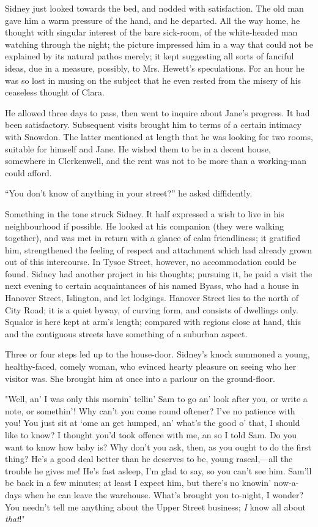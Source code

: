 Sidney just looked towards the bed, and nodded with satisfaction. The
old man gave him a warm pressure of the hand, and he departed. All the
way home, he thought with singular interest of the bare sick-room, of
the white-headed man watching through the night; the picture impressed
him in a way that could not be explained by its natural pathos merely;
it kept suggesting all sorts of fanciful ideas, due in a measure,
possibly, to Mrs. Hewett's speculations. For an hour he was so lost in
musing on the subject that he even rested from the misery of his
ceaseless thought of Clara.

He allowed three days to pass, then went to inquire about Jane's
progress. It had been {\protect\hypertarget{155}{}{}}satisfactory.
Subsequent visits brought him to terms of a certain intimacy with
Snowdon. The latter mentioned at length that he was looking for two
rooms, suitable for himself and Jane. He wished them to be in a decent
house, somewhere in Clerkenwell, and the rent was not to be more than a
working-man could afford.

``You don't know of anything in your street?'' he asked diffidently.

Something in the tone struck Sidney. It half expressed a wish to live in
his neighbourhood if possible. He looked at his companion (they were
walking together), and was met in return with a glance of calm
friendliness; it gratified him, strengthened the feeling of respect and
attachment which had already grown out of this intercourse. In Tysoe
Street, however, no accommodation could be found. Sidney had another
project in his thoughts; pursuing it, he paid a visit the next evening
to certain acquaintances of his named Byass, who had a house in Hanover
Street, Islington, and let lodgings. Hanover Street
{\protect\hypertarget{156}{}{}}lies to the north of City Road; it is a
quiet byway, of curving form, and consists of dwellings only. Squalor is
here kept at arm's length; compared with regions close at hand, this and
the contiguous streets have something of a suburban aspect.

Three or four steps led up to the house-door. Sidney's knock summoned a
young, healthy-faced, comely woman, who evinced hearty pleasure on
seeing who her visitor was. She brought him at once into a parlour on
the ground-floor.

"Well, an' I was only this mornin' tellin' Sam to go an' look after you,
or write a note, or somethin'! Why can't you come round oftener? I've no
patience with you! You just sit at `ome an get humped, an' what's the
good o' that, I should like to know? I thought you'd took offence with
me, an so I told Sam. Do you want to know how baby is? Why don't you
ask, then, as you ought to do the first thing? He's a good deal better
than he deserves to be, young rascal,---all the trouble he gives me!
He's fast {\protect\hypertarget{157}{}{}}asleep, I'm glad to say, so you
can't see him. Sam'll be back in a few minutes; at least I expect him,
but there's no knowin' now-a-days when he can leave the warehouse.
What's brought you to-night, I wonder? You needn't tell me anything
about the Upper Street business; \emph{I} know all about \emph{that}!"


